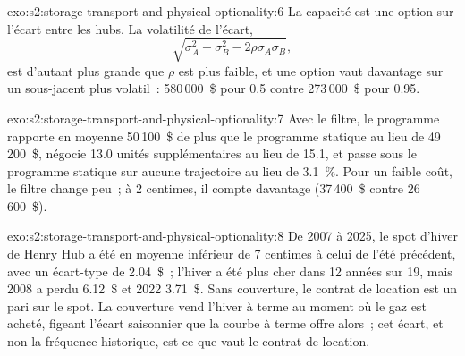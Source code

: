 \begin{solution}{exo:s2:storage-transport-and-physical-optionality:6}
La capacité est une option sur l'écart entre les hubs. La volatilité de l'écart,
\[\sqrt{\sigma_A^2 + \sigma_B^2 - 2\rho\sigma_A\sigma_B},\]
est d'autant plus grande que $\rho$ est plus faible, et une option vaut davantage sur un sous-jacent plus volatil~: 580\,000~\$ pour 0.5 contre 273\,000~\$ pour 0.95.
\end{solution}

\begin{solution}{exo:s2:storage-transport-and-physical-optionality:7}
Avec le filtre, le programme rapporte en moyenne 50\,100~\$ de plus que le programme statique au lieu de 49\,200~\$, négocie 13.0 unités supplémentaires au lieu de 15.1, et passe
sous le programme statique sur aucune trajectoire au lieu de 3.1~\%. Pour un faible coût, le filtre change peu~; à 2 centimes, il compte davantage (37\,400~\$ contre 26\,600~\$).
\end{solution}

\begin{solution}{exo:s2:storage-transport-and-physical-optionality:8}
De 2007 à 2025, le spot d'hiver de Henry Hub a été en moyenne inférieur de 7 centimes à celui de l'été précédent, avec un écart-type de 2.04~\$~; l'hiver a été plus cher
dans 12 années sur 19, mais 2008 a perdu 6.12~\$ et 2022 3.71~\$. Sans couverture, le contrat de location est un pari sur le spot. La couverture vend l'hiver à terme au moment où le gaz est
acheté, figeant l'écart saisonnier que la courbe à terme offre alors~; cet écart, et non la fréquence historique, est ce que vaut le contrat de location.
\end{solution}

